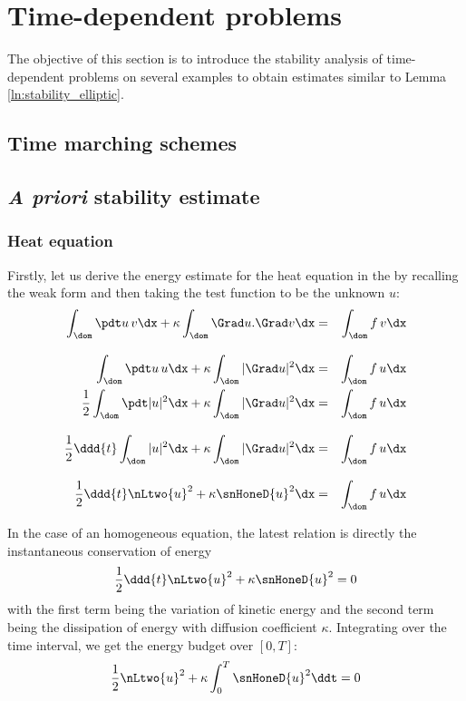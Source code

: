 
\chapter{Time-dependent problems}

The objective of this section is to introduce the \apriori stability analysis of time-dependent problems on several examples to obtain estimates similar to Lemma \eqref{ln:stability_elliptic}.

\section{Time marching schemes}

\section{\textit{A priori} stability estimate}

\subsection{Heat equation}

Firstly, let us derive the energy estimate for the heat equation in the by recalling the weak form and then taking the test function to be the unknown $u$:
\begin{eqnarray*}
\int_\dom \pdt u\, v \dx + \kappa \int_\dom \Grad u . \Grad v \dx &=& \int_\dom f\,v \dx \\[2ex]
\int_\dom \pdt u\, u \dx + \kappa \int_\dom | \Grad u |^2 \dx &=& \int_\dom f\,u \dx \\
\dfrac{1}{2}\int_\dom \pdt |u|^2 \dx + \kappa \int_\dom | \Grad u |^2 \dx &=& \int_\dom f\,u \dx \\[2ex]
\dfrac{1}{2} \ddd{t} \int_\dom  |u|^2 \dx + \kappa \int_\dom | \Grad u |^2 \dx &=& \int_\dom f\,u \dx \\[2ex]
\dfrac{1}{2} \ddd{t} \nLtwo{u}^2 + \kappa \snHoneD{u}^2 \dx &=& \int_\dom f\,u \dx
\end{eqnarray*}

In the case of an homogeneous equation, the latest relation is directly the instantaneous conservation of energy
\begin{equation}
\dfrac{1}{2} \ddd{t} \nLtwo{u}^2 + \kappa \snHoneD{u}^2 = 0
\end{equation}
with the first term being the variation of kinetic energy and the second term being the dissipation of energy with diffusion coefficient $\kappa$.
Integrating over the time interval, we get the energy budget over $[0,T]$:
\begin{equation}\label{eq:energy_budget}
\dfrac{1}{2} \nLtwo{u}^2 + \kappa \int_{0}^T \snHoneD{u}^2 \ddt = 0
\end{equation}

